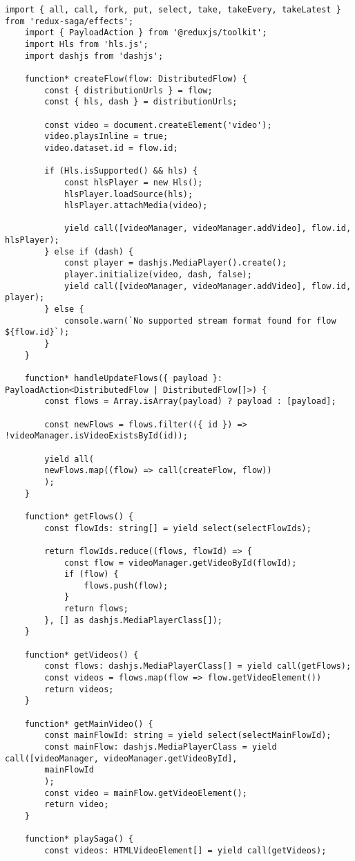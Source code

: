 \begin{lstlisting}[caption={shared/player-sagas.ts}]
	import { all, call, fork, put, select, take, takeEvery, takeLatest } from 'redux-saga/effects';
	import { PayloadAction } from '@reduxjs/toolkit';
	import Hls from 'hls.js';
	import dashjs from 'dashjs';
	
	function* createFlow(flow: DistributedFlow) {
		const { distributionUrls } = flow;
		const { hls, dash } = distributionUrls;
		
		const video = document.createElement('video');
		video.playsInline = true;
		video.dataset.id = flow.id;
		
		if (Hls.isSupported() && hls) {
			const hlsPlayer = new Hls();
			hlsPlayer.loadSource(hls);
			hlsPlayer.attachMedia(video);
			
			yield call([videoManager, videoManager.addVideo], flow.id, hlsPlayer);
		} else if (dash) {
			const player = dashjs.MediaPlayer().create();
			player.initialize(video, dash, false);
			yield call([videoManager, videoManager.addVideo], flow.id, player);
		} else {
			console.warn(`No supported stream format found for flow ${flow.id}`);
		}
	}
	
	function* handleUpdateFlows({ payload }: PayloadAction<DistributedFlow | DistributedFlow[]>) {
		const flows = Array.isArray(payload) ? payload : [payload];
		
		const newFlows = flows.filter(({ id }) => !videoManager.isVideoExistsById(id));
		
		yield all(
		newFlows.map((flow) => call(createFlow, flow))
		);
	}
	
	function* getFlows() {
		const flowIds: string[] = yield select(selectFlowIds);
		
		return flowIds.reduce((flows, flowId) => {
			const flow = videoManager.getVideoById(flowId);
			if (flow) {
				flows.push(flow);
			}
			return flows;
		}, [] as dashjs.MediaPlayerClass[]);
	}
	
	function* getVideos() {
		const flows: dashjs.MediaPlayerClass[] = yield call(getFlows);
		const videos = flows.map(flow => flow.getVideoElement())
		return videos;
	}
	
	function* getMainVideo() {
		const mainFlowId: string = yield select(selectMainFlowId);
		const mainFlow: dashjs.MediaPlayerClass = yield call([videoManager, videoManager.getVideoById],
		mainFlowId
		);
		const video = mainFlow.getVideoElement();
		return video;
	}
	
	function* playSaga() {
		const videos: HTMLVideoElement[] = yield call(getVideos);
		

\end{lstlisting}
